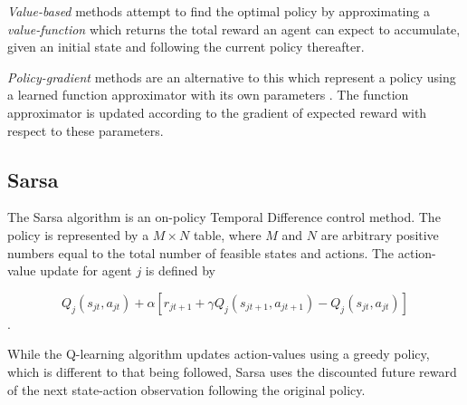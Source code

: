 \textit{Value-based} methods attempt to find the optimal policy by
approximating a \textit{value-function} which returns the total reward an
agent can expect to accumulate, given an initial state and following the
current policy thereafter.

\textit{Policy-gradient} methods are an alternative to this which
represent a policy using a learned function approximator with its own
parameters \cite{Sutton99policygradient}.  The function approximator is updated
according to the gradient of expected reward with respect to these parameters.

\subsection{Sarsa}
The Sarsa algorithm is an on-policy Temporal Difference control method.  The
policy is represented by a $M \times N$ table, where $M$ and $N$ are
arbitrary positive numbers equal to the total number of feasible states and
actions. The action-value update for agent $j$ is defined by

\begin{equation}
Q_j(s_{jt},a_{jt}) + \alpha [r_{jt+1} + \gamma Q_j(s_{jt+1},a_{jt+1}) -
Q_j(s_{jt},a_{jt})]
\end{equation}.

While the Q-learning algorithm updates action-values using a greedy policy,
which is different to that being followed, Sarsa uses the discounted future
reward of the next state-action observation following the original policy.

